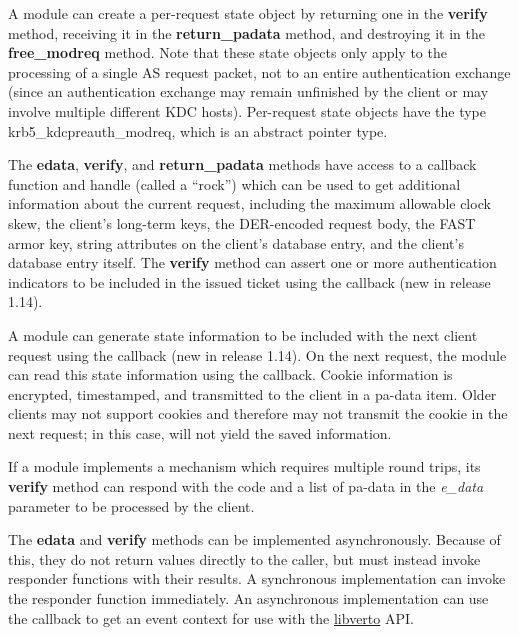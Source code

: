 \documentclass[letterpaper,10pt,english]{sphinxmanual}
\begin{document}
A module can create a per-request state object by returning one in the
\textbf{verify} method, receiving it in the \textbf{return\_padata} method, and
destroying it in the \textbf{free\_modreq} method.  Note that these state
objects only apply to the processing of a single AS request packet,
not to an entire authentication exchange (since an authentication
exchange may remain unfinished by the client or may involve multiple
different KDC hosts).  Per-request state objects have the type
krb5\_kdcpreauth\_modreq, which is an abstract pointer type.

The \textbf{edata}, \textbf{verify}, and \textbf{return\_padata} methods have access
to a callback function and handle (called a ``rock'') which can be used
to get additional information about the current request, including the
maximum allowable clock skew, the client's long-term keys, the
DER-encoded request body, the FAST armor key, string attributes on the
client's database entry, and the client's database entry itself.  The
\textbf{verify} method can assert one or more authentication indicators to
be included in the issued ticket using the 
callback (new in release 1.14).

A module can generate state information to be included with the next
client request using the  callback (new in release
1.14).  On the next request, the module can read this state
information using the  callback.  Cookie information is
encrypted, timestamped, and transmitted to the client in a
 pa-data item.  Older clients may not support cookies
and therefore may not transmit the cookie in the next request; in this
case,  will not yield the saved information.

If a module implements a mechanism which requires multiple round
trips, its \textbf{verify} method can respond with the code
 and a list of pa-data in
the \emph{e\_data} parameter to be processed by the client.

The \textbf{edata} and \textbf{verify} methods can be implemented
asynchronously.  Because of this, they do not return values directly
to the caller, but must instead invoke responder functions with their
results.  A synchronous implementation can invoke the responder
function immediately.  An asynchronous implementation can use the
callback to get an event context for use with the \href{https://fedorahosted.org/libverto/}{libverto} API.
\end{document}
